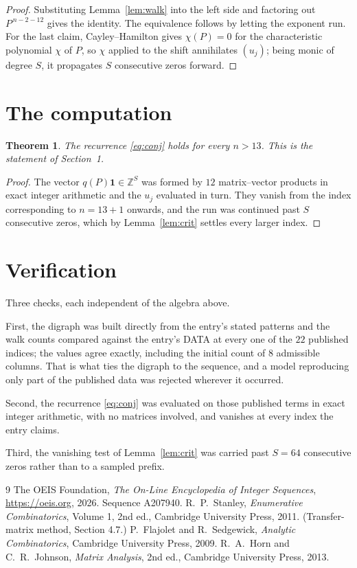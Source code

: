 \documentclass[11pt,a4paper]{article}
\theoremstyle{plain}
\newtheorem{theorem}{Theorem}
\theoremstyle{definition}
\begin{document}
\begin{proof}
Substituting Lemma~\ref{lem:walk} into the left side and factoring out
$P^{\,n-2-12}$ gives the identity. The equivalence follows by letting the exponent
run. For the last claim, Cayley--Hamilton gives $\chi(P)=0$ for the characteristic
polynomial $\chi$ of $P$, so $\chi$ applied to the shift annihilates $(u_j)$; being monic of
degree $S$, it propagates $S$ consecutive zeros forward.
\end{proof}

\section{The computation}

\begin{theorem}
The recurrence \eqref{eq:conj} holds for every $n>13$. This is the statement of
Section~1.
\end{theorem}

\begin{proof}
The vector $q(P)\mathbf{1}\in\mathbb{Z}^{S}$ was formed by $12$ matrix--vector
products in exact integer arithmetic and the $u_j$ evaluated in turn. They vanish from the
index corresponding to $n=13+1$ onwards, and the run was continued past $S$ consecutive
zeros, which by Lemma~\ref{lem:crit} settles every larger index.
\end{proof}

\section{Verification}

Three checks, each independent of the algebra above.

First, the digraph was built directly from the entry's stated patterns and the walk counts
compared against the entry's DATA at every one of the $22$ published indices; the
values agree exactly, including the initial count of $8$ admissible columns. That is
what ties the digraph to the sequence, and a model reproducing only part of the published
data was rejected wherever it occurred.

Second, the recurrence \eqref{eq:conj} was evaluated on those published terms in exact
integer arithmetic, with no matrices involved, and vanishes at every index the entry claims.

Third, the vanishing test of Lemma~\ref{lem:crit} was carried past $S=64$ consecutive
zeros rather than to a sampled prefix.

\begin{thebibliography}{9}
 The OEIS Foundation, \emph{The On-Line Encyclopedia of Integer
Sequences}, \url{https://oeis.org}, 2026. Sequence A207940.
 R.~P.~Stanley, \emph{Enumerative Combinatorics}, Volume 1, 2nd ed.,
Cambridge University Press, 2011. (Transfer-matrix method, Section 4.7.)
 P.~Flajolet and R.~Sedgewick, \emph{Analytic Combinatorics}, Cambridge
University Press, 2009.
 R.~A.~Horn and C.~R.~Johnson, \emph{Matrix Analysis}, 2nd ed., Cambridge
University Press, 2013.
\end{thebibliography}
\end{document}
